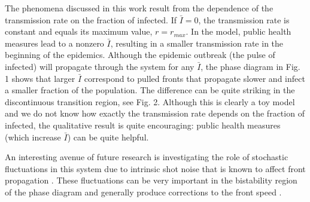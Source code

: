 \documentclass[pre,aps,twocolumn,showpacs]{revtex4}
\begin{document}
The phenomena discussed in this work result from the dependence of the transmission rate on the fraction of infected. If $\bar{I}=0$, the transmission rate is constant and equals its maximum value, $r = r_{max}$. In the model, public health measures lead to a nonzero $\bar{I}$, resulting in a smaller transmission rate in the beginning of the epidemics. Although the epidemic outbreak (the pulse of infected) will propagate through the system for any $\bar{I}$, the phase diagram in Fig. 1 shows that larger $\bar{I}$ correspond to pulled fronts that propagate slower and infect a smaller fraction of the population. The difference can be quite striking in the discontinuous transition region, see Fig. 2. Although this is clearly a toy model and we do not know how exactly the transmission rate depends on the fraction of infected, the qualitative result is quite encouraging: public health measures (which increase $\bar{I}$) can be quite helpful.

An interesting avenue of future research is investigating the role of stochastic fluctuations in this system due to intrinsic shot noise that is known to affect front propagation \cite{MSK}. These fluctuations can be very important in the bistability region of the phase diagram and generally produce corrections to the front speed \cite{fluctuations}.
\end{document}

